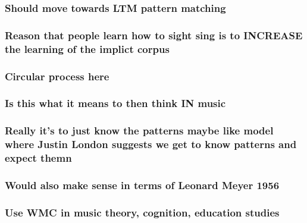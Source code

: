 \documentclass[]{book}
\theoremstyle{definition}
\theoremstyle{definition}
\theoremstyle{definition}
\theoremstyle{remark}
\begin{document}
\hypertarget{should-move-towards-ltm-pattern-matching}{%
\subsubsection{Should move towards LTM pattern
matching}\label{should-move-towards-ltm-pattern-matching}}

\hypertarget{reason-that-people-learn-how-to-sight-sing-is-to-increase-the-learning-of-the-implict-corpus}{%
\subsubsection{Reason that people learn how to sight sing is to INCREASE
the learning of the implict
corpus}\label{reason-that-people-learn-how-to-sight-sing-is-to-increase-the-learning-of-the-implict-corpus}}

\hypertarget{circular-process-here}{%
\subsubsection{Circular process here}\label{circular-process-here}}

\hypertarget{is-this-what-it-means-to-then-think-in-music}{%
\subsubsection{Is this what it means to then think IN
music}\label{is-this-what-it-means-to-then-think-in-music}}

\hypertarget{really-its-to-just-know-the-patterns-maybe-like-model-where-justin-london-suggests-we-get-to-know-patterns-and-expect-themn}{%
\subsubsection{Really it's to just know the patterns maybe like model
where Justin London suggests we get to know patterns and expect
themn}\label{really-its-to-just-know-the-patterns-maybe-like-model-where-justin-london-suggests-we-get-to-know-patterns-and-expect-themn}}

\hypertarget{would-also-make-sense-in-terms-of-leonard-meyer-1956}{%
\subsubsection{Would also make sense in terms of Leonard Meyer
1956}\label{would-also-make-sense-in-terms-of-leonard-meyer-1956}}

\hypertarget{use-wmc-in-music-theory-cognition-education-studies}{%
\subsubsection{Use WMC in music theory, cognition, education
studies}\label{use-wmc-in-music-theory-cognition-education-studies}}
\end{document}
